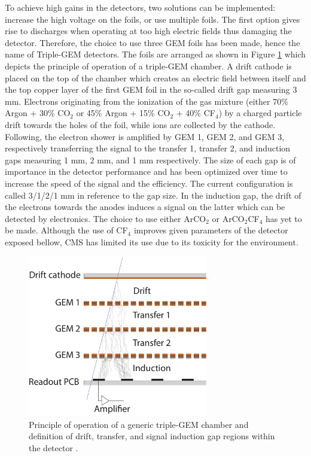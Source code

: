     To achieve high gains in the detectors, two solutions can be implemented: increase the high voltage on the foils, or use multiple foils. The first option gives rise to discharges when operating at too high electric fields thus damaging the detector. Therefore, the choice to use three GEM foils has been made, hence the name of Triple-GEM detectors. The foils are arranged as shown in Figure \ref{fig:II-1-triple} which depicts the principle of operation of a triple-GEM chamber. A drift cathode is placed on the top of the chamber which creates an electric field between itself and the top copper layer of the first GEM foil in the so-called drift gap measuring 3 mm. Electrons originating from the ionization of the gas mixture (either 70\% Argon + 30\% CO$_2$ or 45\% Argon + 15\% CO$_2$ + 40\% CF$_4$) by a charged particle drift towards the holes of the foil, while ions are collected by the cathode. Following, the electron shower is amplified by GEM 1, GEM 2, and GEM 3, respectively transferring the signal to the transfer 1, transfer 2, and induction gaps measuring 1 mm, 2 mm, and 1 mm respectively. The size of each gap is of importance in the detector performance and has been optimized over time to increase the speed of the signal and the efficiency. The current configuration is called 3/1/2/1 mm in reference to the gap size. In the induction gap, the drift of the electrons towards the anodes induces a signal on the latter which can be detected by electronics. The choice to use either ArCO$_2$ or ArCO$_2$CF$_4$ has yet to be made. Although the use of CF$_4$ improves given parameters of the detector exposed bellow, CMS has limited its use due to its toxicity for the environment. \\

    \begin{figure}[t!]
      \centering
      \includegraphics[width=0.7\textwidth]{img/II-1-gem/triple-gem-foils.pdf}
      \caption{Principle of operation of a generic triple-GEM chamber and definition of drift, transfer, and signal induction gap regions within the detector \cite{Colaleo:2021453}.}
      \label{fig:II-1-triple}
    \end{figure}


